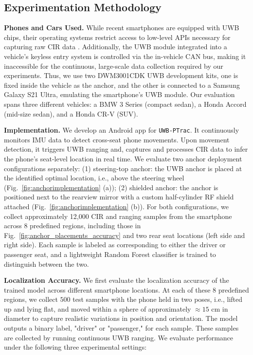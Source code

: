 \documentclass[sigconf]{acmart}
\newcommand{\edited}[1]{#1}
\newcommand{\name}{{{\tt UWB-PTrac}}}
\newcommand{\vp}{\vspace{-1.5em}}
\begin{document}
\subsection{Experimentation Methodology}
\label{sec:evaluation:methodology}
\textbf{Phones and Cars Used.} While recent smartphones are equipped with UWB 
chips, their operating systems restrict access to low-level APIs necessary for capturing raw CIR data \cite{zhang2023embracing}.
%
Additionally, the UWB module integrated into a vehicle’s keyless entry system 
is controlled via the in-vehicle CAN bus, making it inaccessible for the 
continuous, large-scale data collection required by our experiments.
%
Thus, we use two DWM3001CDK UWB development kits, one is fixed inside the 
vehicle as the anchor, and the other is connected to a Samsung Galaxy 
S21 Ultra, emulating the smartphone’s UWB module.
%
Our evaluation spans three different vehicles: a BMW 3 Series \edited{(compact sedan)}, a Honda Accord \edited{(mid-size sedan)}, and a Honda CR-V \edited{(SUV)}.

\textbf{Implementation.} We develop an Android app for \name. 
It continuously monitors IMU data to detect cross-seat phone movements.
Upon movement detection, it triggers UWB ranging and, captures and processes 
CIR data to infer the phone’s seat-level location in real time.
%
We evaluate two anchor deployment configurations separately: 
(1) steering-top
anchor: the UWB anchor is placed at the identified optimal location, i.e., above
the steering wheel (Fig.~\ref{fig:anchorimplementation} (a)); (2) shielded
anchor: the anchor is positioned next to the rearview mirror with 
a custom half-cylinder RF shield attached (Fig.~\ref{fig:anchorimplementation} (b)).
%
For both configurations, we collect approximately 12,000 CIR and ranging 
samples from the smartphone across 8 predefined regions, including those in Fig.~\ref{fig:anchor_placements_accuracy} and two rear seat locations (left side and right side).
%
Each sample is labeled as corresponding to either the driver or passenger seat, 
and a lightweight Random Forest classifier is trained to distinguish between 
the two.


\textbf{Localization Accuracy.}
We first evaluate the localization accuracy of the trained model across 
different smartphone locations. At each of these 8 predefined regions, we collect $500$ test samples with the phone held in two 
poses, i.e., lifted up and lying flat, and moved within a sphere of 
approximately $\approx 15$ cm in diameter to capture realistic variations 
in position and orientation. \edited{The model outputs a binary label, 
"driver" or "passenger," for each sample.} \edited{These samples are 
collected by running continuous UWB ranging.}
%
We evaluate performance under the following three experimental settings:
\end{document}
